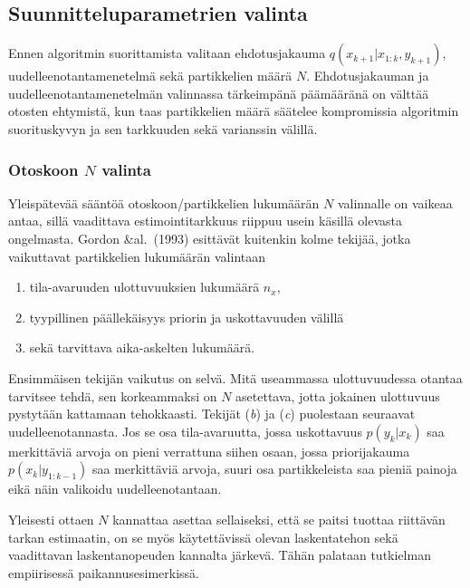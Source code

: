 \documentclass[
  12pt,
  a4paper, twoside]{book}
\providecommand{\tightlist}{%
  \setlength{\itemsep}{0pt}\setlength{\parskip}{0pt}}
\begin{document}
\subsection{Suunnitteluparametrien valinta}

Ennen algoritmin suorittamista valitaan ehdotusjakauma \(q(x_{k+1}|x_{1:k},y_{k+1})\), uudelleenotantamenetelmä sekä partikkelien määrä \(N\). Ehdotusjakauman ja uudelleenotantamenetelmän valinnassa tärkeimpänä päämääränä on välttää otosten ehtymistä, kun taas partikkelien määrä säätelee kompromissia algoritmin suorituskyvyn ja sen tarkkuuden sekä varianssin välillä.

\subsubsection{Otoskoon $N$ valinta}

Yleispätevää sääntöä otoskoon/partikkelien lukumäärän \(N\) valinnalle on vaikeaa antaa, sillä vaadittava estimointitarkkuus riippuu usein käsillä olevasta ongelmasta. Gordon \&al.~(1993) \citep{Gordon-1993} esittävät kuitenkin kolme tekijää, jotka vaikuttavat partikkelien lukumäärän valintaan

\begin{enumerate}
\def\labelenumi{\alph{enumi}.}
\tightlist
\item
  tila-avaruuden ulottuvuuksien lukumäärä \({n_x}\),
\item
  tyypillinen päällekäisyys priorin ja uskottavuuden välillä
\item
  sekä tarvittava aika-askelten lukumäärä.
\end{enumerate}

Ensimmäisen tekijän vaikutus on selvä. Mitä useammassa ulottuvuudessa otantaa tarvitsee tehdä, sen korkeammaksi on \(N\) asetettava, jotta jokainen ulottuvuus pystytään kattamaan tehokkaasti. Tekijät (\textit{b}) ja (\textit{c}) puolestaan seuraavat uudelleenotannasta. Jos se osa tila-avaruutta, jossa uskottavuus \(p(y_k|x_k)\) saa merkittäviä arvoja on pieni verrattuna siihen osaan, jossa priorijakauma \(p(x_k|y_{1:k-1})\) saa merkittäviä arvoja, suuri osa partikkeleista saa pieniä painoja eikä näin valikoidu uudelleenotantaan.

Yleisesti ottaen \(N\) kannattaa asettaa sellaiseksi, että se paitsi tuottaa riittävän tarkan estimaatin, on se myös käytettävissä olevan laskentatehon sekä vaadittavan laskentanopeuden kannalta järkevä. Tähän palataan tutkielman empiirisessä paikannusesimerkissä.
\end{document}
